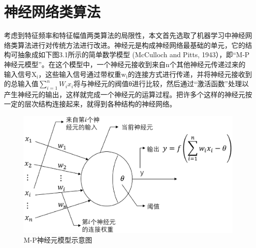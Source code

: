 \section{神经网络类算法}
\indent 考虑到特征频率和特征幅值两类算法的局限性，本文首先选取了机器学习中神经网络类算法进行对传统方法进行改进。神经元是构成神经网络最基础的单元，它的结构可抽象成如下图3.1所示的简单数学模型 (McCulloch and Pitts, 1943），即“M-P神经元模型”。在这个模型中，一个神经元接收到来自n个其他神经元传递过来的输入信号$\mathrm{X}_{\mathrm{i}}$，这些输入信号通过带权重$\mathrm{w}_{\mathrm{i}}$的连接方式进行传递，并将神经元接收到的总输入值$\sum_{i=1}^{n} W_{i} x_{i}$将与神经元的阀值θ进行比较，然后通过“激活函数”处理以产生神经元的输出，这样就完成一个神经元的运算过程。把许多个这样的神经元按一定的层次结构连接起来，就得到各种结构的神经网络。\\
 \begin{figure}[!h]%
	\centering  %
	\includegraphics[width=\linewidth]{img/mp.eps}  %
	\caption{M-P神经元模型示意图}  %
	\label{fig:mcmthesis-logo}   %
\end{figure}
